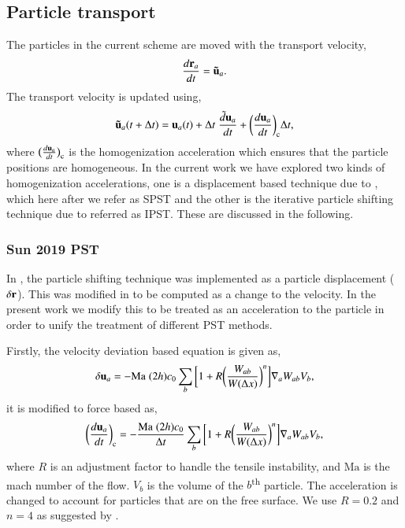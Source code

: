 \subsection{Particle transport}

The particles in the current scheme are moved with the transport velocity,
\begin{equation}
  \label{eq:transport_velocity_position_derivative}
  \frac{d\mathbf{r}_a}{dt} = \mathbf{\tilde{u}}_a.
\end{equation}
%
The transport velocity is updated using,
\begin{equation}
  \label{eq:transport_velocity}
  \mathbf{\tilde{u}}_a(t + \Delta t) =\mathbf{u}_a(t) + \Delta t \; \frac{\tilde{d} \mathbf{u}_a}{dt} +
  \bigg(\frac{d \mathbf{u}_{a}}{dt}\bigg)_{\text{c}} \Delta t,
\end{equation}
%
where $\big(\frac{d \mathbf{u}_a}{dt}\big)_{\text{c}}$ is the homogenization
acceleration which ensures that the particle positions are homogeneous. In the
current work we have explored two kinds of homogenization accelerations, one
is a displacement based technique due to \cite{sun2017deltaplus}, which here
after we refer as SPST and the other is the iterative particle shifting
technique due to \cite{huang_kernel_2019} referred as IPST. These are
discussed in the following.


\subsubsection{Sun 2019 PST}
\label{sec:sunpst}

In \cite{sun2017deltaplus}, the particle shifting technique was implemented as
a particle displacement ($\delta \mathbf{r}$). This was modified in
\cite{sun_consistent_2019} to be computed as a change to the velocity. In the
present work we modify this to be treated as an acceleration to the particle
in order to unify the treatment of different PST methods.

Firstly, the velocity deviation based equation is given as,
\begin{equation}
  \label{eq:sun2019_pst}
  \delta \mathbf{u}_a = - \text{Ma} \; (2h) c_0 \sum_b \bigg[
  1 + R \bigg( \frac{W_{ab}}{W(\Delta x)} \bigg)^n  \bigg] \nabla_a W_{ab} V_b,
\end{equation}
%
it is modified to force based as,
\begin{equation}
  \label{eq:sun2019_pst}
  \bigg(\frac{d \mathbf{u}_a}{dt}\bigg)_{\text{c}} = - \frac{\text{Ma} \;
    (2h) c_0}{\Delta t} \sum_b \bigg[1 + R \bigg( \frac{W_{ab}}{W(\Delta x)} \bigg)^n
  \bigg] \nabla_a W_{ab} V_b,
\end{equation}
where $R$ is an adjustment factor to handle the tensile instability, and
$\text{Ma}$ is the mach number of the flow. $V_b$ is the volume of the
$b$\textsuperscript{th} particle. The acceleration is changed to account for
particles that are on the free surface. We use $R = 0.2$ and $n = 4$ as
suggested by \cite{sun_consistent_2019}.


